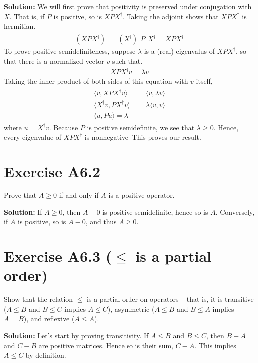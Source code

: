 \documentclass{book}
\newcommand{\innerprod}[2]{\langle#1,#2\rangle}
\begin{document}
    \textbf{Solution:} We will first prove that positivity is preserved under conjugation with $X$. That is, if $P$ is positive, so is $XPX^\dagger$. Taking the adjoint shows that $XPX^\dagger$ is hermitian.
    \begin{align}
        (XPX^\dagger)^\dagger = (X^\dagger)^\dagger P^\dagger X^\dagger = XPX^\dagger
    \end{align}
    To prove positive-semidefiniteness, suppose $\lambda$ is a (real) eigenvalus of $XPX^\dagger$, so that there is a normalized vector $v$ such that.
    \begin{align}
        XPX^\dagger v = \lambda v
    \end{align}
    Taking the inner product of both sides of this equation with $v$ itself,
    \begin{align}
    \begin{aligned}
        \innerprod{v}{XPX^\dagger v} &= \innerprod{v}{\lambda v} \\
        \innerprod{X^\dagger v}{PX^\dagger v} &= \lambda \innerprod{v}{v} \\
        \innerprod{u}{Pu} = \lambda,
    \end{aligned}
    \end{align}
    where $u = X^\dagger v$. Because $P$ is positive semidefinite, we see that $\lambda \geq 0$. Hence, every eigenvalue of $XPX^\dagger$ is nonnegative. This proves our result.  

\section*{Exercise A6.2}
    Prove that $A\geq 0$ if and only if $A$ is a positive operator.
    
    \textbf{Solution:} If $A\geq 0$, then $A - 0$ is positive semidefinite, hence so is $A$. Conversely, if $A$ is positive, so is $A-0$, and thus $A \geq 0$.
    
\section*{Exercise A6.3 ($\leq$ is a partial order)}
    Show that the relation $\leq$ is a partial order on operators -- that is, it is transitive ($A\leq B$ and $B \leq C$ implies $A \leq C$), asymmetric ($A \leq B$ and $B \leq A$ implies $A = B$), and reflexive ($A\leq A$).

    \textbf{Solution:} Let's start by proving transitivity. If $A\leq B$ and $B\leq C$, then $B-A$ and $C - B$ are positive matrices. Hence so is their sum, $C-A$. This implies $A \leq C$ by definition.
    
\end{document}

